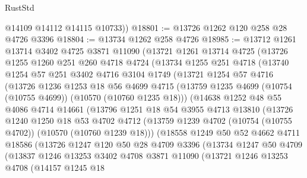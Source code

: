 \begin{lexlean}{RustStd}
\begin{coremodule}
        @14109
        @14112
        @14115
        @10733))
@18801 := @13726 @1262 @120 @258 @28 @4726 @3396
@18804 := @13734 @1262 @258 @4726
@18985 := @13712
    @1261
    @13714
    @3402
    @4725
    @3871
    @11090
    (@13721
      @1261
      @13714
      @4725
      (@13726
        @1255
        @1260
        @251
        @260
        @4718
        @4724
        (@13734
          @1255
          @251
          @4718
          (@13740
            @1254
            @57
            @251
            @3402
            @4716
            @3104
            @1749
            (@13721
              @1254
              @57
              @4716
              (@13726
                @1236
                @1253
                @18
                @56
                @4699
                @4715
                (@13759 @1235 @4699 (@10754 (@10755 @4699)) (@10570 (@10760 @1235 @18)))
                (@14638
                  @1252
                  @48
                  @55
                  @4086
                  @4714
                  @14661
                  (@13796
                    @1251
                    @18
                    @54
                    @3955
                    @4713
                    @13810
                    (@13726
                      @1240
                      @1250
                      @18
                      @53
                      @4702
                      @4712
                      (@13759 @1239 @4702 (@10754 (@10755 @4702)) (@10570 (@10760 @1239 @18)))
                      (@18558
                        @1249
                        @50
                        @52
                        @4662
                        @4711
                        @18586
                        (@13726
                          @1247
                          @120
                          @50
                          @28
                          @4709
                          @3396
                          (@13734
                            @1247
                            @50
                            @4709
                            (@13837
                              @1246
                              @13253
                              @3402
                              @4708
                              @3871
                              @11090
                              (@13721
                                @1246
                                @13253
                                @4708
                                (@14157
                                  @1245
                                  @18

\end{coremodule}
\end{lexlean}
